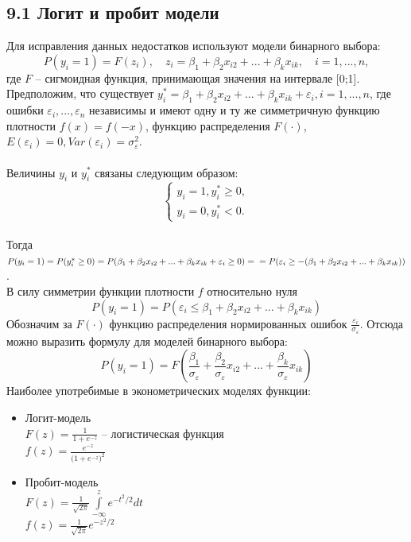 \documentclass[a0,final]{a0poster}
\begin{document}
\begin{multicols}{4}
\subsection*{9.1 Логит и пробит модели}
Для исправления данных недостатков используют модели бинарного выбора: $$P(y_i = 1) = F(z_i), \quad z_i = \beta_1 + \beta_2x_{i2} + ... + \beta_kx_{ik}, \quad i = 1, ..., n,$$ где $F$ -- сигмоидная функция, принимающая значения на интервале [0;1]. \\
Предположим, что существует $y_i^* = \beta_1 + \beta_2x_{i2} + ... + \beta_kx_{ik} + \varepsilon_i, i = 1, ..., n$, где ошибки $\varepsilon_i, ..., \varepsilon_n$ независимы и имеют одну и ту же симметричную функцию плотности $f(x) = f(-x)$, функцию распределения $F(\cdot)$, $E(\varepsilon_i) = 0, Var(\varepsilon_i) = \sigma^2_\varepsilon$.\\
\\
Величины $y_i$ и $y_i^*$ связаны следующим образом:
\begin{equation*}
 \begin{cases}
   y_i = 1, y^*_i \geq 0,\\
   y_i = 0, y^*_i < 0.
 \end{cases}
\end{equation*}
\\
Тогда $P(y_i = 1) = P(y^*_i \geq 0) = P(\beta_1 + \beta_2x_{i2} + ... + \beta_kx_{ik} + \varepsilon_i \geq 0) =\\
= P(\varepsilon_i \geq -(\beta_1 + \beta_2x_{i2} + ... + \beta_kx_{ik}))$.\\
В силу симметрии функции плотности $f$ относительно нуля $$P(y_i = 1) = P(\varepsilon_i \leq \beta_1 + \beta_2x_{i2} + ... + \beta_kx_{ik})$$
Обозначим за $F(\cdot)$ функцию распределения нормированных ошибок $\frac{\varepsilon_i}{\sigma_\varepsilon}$. Отсюда можно выразить формулу для моделей бинарного выбора:
$$P(y_i = 1) = F(\frac{\beta_1}{\sigma_\varepsilon} + \frac{\beta_2}{\sigma_\varepsilon}x_{i2} + ... + \frac{\beta_k}{\sigma_\varepsilon}x_{ik})$$
Наиболее употребимые в эконометрических моделях функции:
\begin{itemize}
\item Логит-модель\\
$F(z) = \frac{1}{1 + e^{-z}}$ -- логистическая функция\\
$f(z) = \frac{ e^{-z}}{{(1 + e^{-z}})^2}$
\item Пробит-модель\\
$F(z) = \frac{1}{\sqrt{2\pi}} \overset{z}{\underset{-\infty}{\int}} {e^{-{t^2}/2}dt}$\\
$f(z) = \frac{1}{\sqrt{2\pi}} e^{-{z^2}/2}$
\end{itemize}

\end{multicols}
\end{document}
